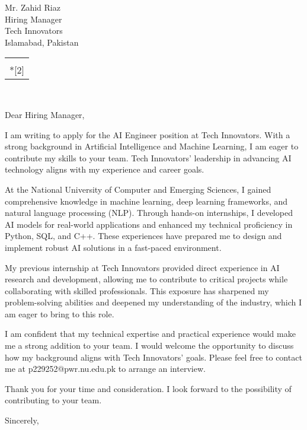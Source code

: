 \documentclass[12pt]{letter}
\date{October 9, 2024}
\makeatletter
\renewcommand*{\opening}[1]{\ifx\@empty\fromaddress
  \thispagestyle{firstpage}%
  {\raggedright\@date\par}%
  \else
  \thispagestyle{empty}%
  {\raggedright\begin{tabular}{@{}l@{}}\ignorespaces
    \fromaddress \\*[2\parskip]%
    \@date \end{tabular}\par}%
  \fi
  \vspace{2\parskip}%
  {\raggedright\toname \\ \toaddress \par}%
  \vspace{2\parskip}%
  #1\par\nobreak}
\renewcommand{\closing}[1]{\par\nobreak\vspace{\parskip}%
  \stopbreaks
  \noindent
  \parbox{\textwidth}{\raggedright
    \ignorespaces #1\\[4\medskipamount]%
    \ifx\@empty\fromsig
      \fromname
    \else \fromsig \fi\strut}%
  \par}
\renewcommand{\ps}{\par\raggedright\nobreak\noindent\hspace{0pt}}
\makeatother
\begin{document}
\begin{letter}{Mr. Zahid Riaz \\ Hiring Manager \\ Tech Innovators \\ Islamabad, Pakistan}

\opening{Dear Hiring Manager,}
I am writing to apply for the AI Engineer position at Tech Innovators. With a strong background in Artificial Intelligence and Machine Learning, I am eager to contribute my skills to your team. Tech Innovators’ leadership in advancing AI technology aligns with my experience and career goals.

At the National University of Computer and Emerging Sciences, I gained comprehensive knowledge in machine learning, deep learning frameworks, and natural language processing (NLP). Through hands-on internships, I developed AI models for real-world applications and enhanced my technical proficiency in Python, SQL, and C++. These experiences have prepared me to design and implement robust AI solutions in a fast-paced environment.

My previous internship at Tech Innovators provided direct experience in AI research and development, allowing me to contribute to critical projects while collaborating with skilled professionals. This exposure has sharpened my problem-solving abilities and deepened my understanding of the industry, which I am eager to bring to this role.

I am confident that my technical expertise and practical experience would make me a strong addition to your team. I would welcome the opportunity to discuss how my background aligns with Tech Innovators' goals. Please feel free to contact me at p229252@pwr.nu.edu.pk to arrange an interview.

Thank you for your time and consideration. I look forward to the possibility of contributing to your team.
\closing{Sincerely,}

\ps{Enclosures: Resume}

\end{letter}
\end{document}
